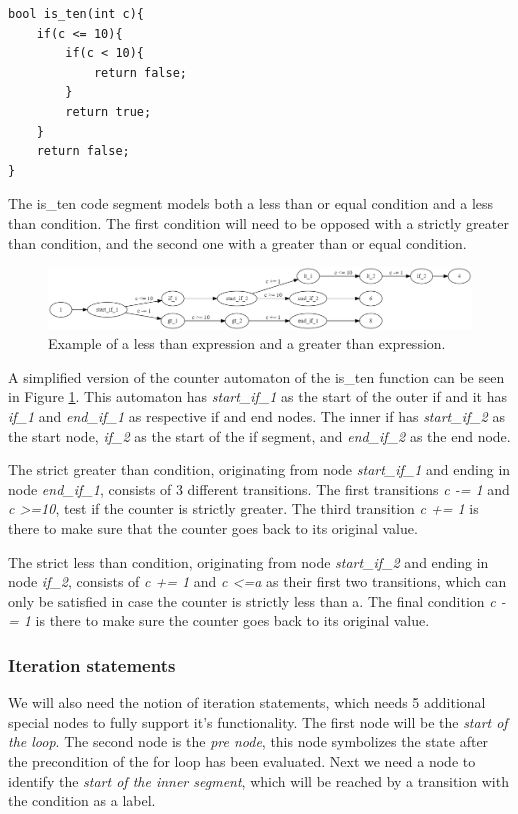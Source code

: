 \documentclass[12pt]{article}
\begin{document}
\begin{lstlisting}[style=CStyle]
bool is_ten(int c){
	if(c <= 10){
		if(c < 10){
			return false;
		}
		return true;
	}
	return false;
}
\end{lstlisting}

The is\_ten code segment models both a less than or equal condition and a less than condition. The first condition will need to be opposed with a strictly greater than condition, and the second one with a greater than or equal condition.

\begin{figure}[h]
	\centering
	\includegraphics[width=\linewidth]{less_than_greater_than}
	\caption{Example of a less than expression and a greater than expression.}
	\label{fig:less_than_greater_than}
\end{figure}

A simplified version of the counter automaton of the is\_ten function can be seen in Figure \ref{fig:less_than_greater_than}. This automaton has \textit{start\_if\_1} as the start of the outer if and it has \textit{if\_1} and \textit{end\_if\_1} as respective if and end nodes. The inner if has \textit{start\_if\_2} as the start node, \textit{if\_2} as the start of the if segment, and \textit{end\_if\_2} as the end node.

The strict greater than condition, originating from node \textit{start\_if\_1} and ending in node \textit{end\_if\_1}, consists of 3 different transitions. The first transitions \textit{c -= 1} and \textit{c \textgreater =10}, test if the counter is strictly greater. The third transition \textit{c += 1} is there to make sure that the counter goes back to its original value.

The strict less than condition, originating from node \textit{start\_if\_2} and ending in node \textit{if\_2}, consists of \textit{c += 1} and \textit{c \textless =a} as their first two transitions, which can only be satisfied in case the counter is strictly less than a. The final condition \textit{c -= 1} is there to make sure the counter goes back to its original value.

\subsubsection{Iteration statements}
We will also need the notion of iteration statements, which needs 5 additional special nodes to fully support it's functionality. The first node will be the \textit{start of the loop}. The second node is the \textit{pre node}, this node symbolizes the state after the precondition of the for loop has been evaluated. Next we need a node to identify the \textit{start of the inner segment}, which will be reached by a transition with the condition as a label. 
\end{document}
